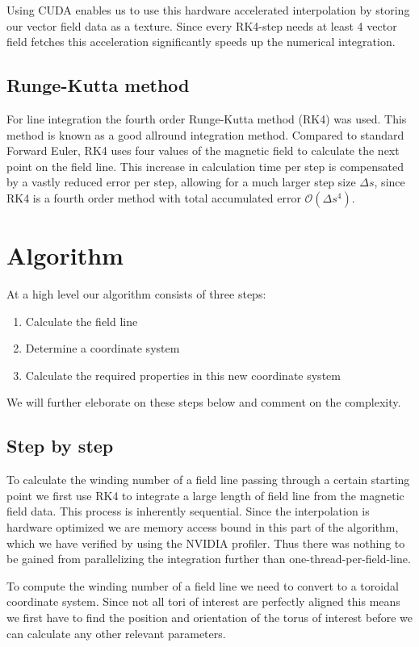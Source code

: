 \documentclass{article}
\renewcommand{\O}[1]{\ensuremath{\mathcal{O}\left(#1\right)}}
\begin{document}
Using CUDA enables us to use this hardware accelerated interpolation by storing our vector field data as a texture. 
Since every RK4-step needs at least 4 vector field fetches this acceleration significantly speeds up the numerical integration. %

\subsection{Runge-Kutta method}
For line integration the fourth order Runge-Kutta method (RK4) was used.  This method is known as a good allround integration method.
Compared to standard Forward Euler, RK4 uses four values of the magnetic field to calculate the next point on the field line. 
This increase in calculation time per step is compensated by a vastly reduced error per step, allowing for a much larger step size $\Delta s$, since RK4 is a fourth order method with total accumulated error $\O{\Delta s^4}$.

\section{Algorithm}
At a high level our algorithm consists of three steps: 
\begin{enumerate}
	\item Calculate the field line
	\item Determine a coordinate system
	\item Calculate the required properties in this new coordinate system
\end{enumerate}
We will further eleborate on these steps below and comment on the complexity.\\

\subsection{Step by step}

To calculate the winding number of a field line passing through a certain starting point we first use RK4 to integrate a large length of field line from the magnetic field data. 
This process is inherently sequential.
Since the interpolation is hardware optimized we are memory access bound in this part of the algorithm, which we have verified by using the NVIDIA profiler. 
Thus there was nothing to be gained from parallelizing the integration further than one-thread-per-field-line.

To compute the winding number of a field line we need to convert to a toroidal coordinate system. Since not all tori of interest are perfectly aligned this means we first have to find the position and orientation of the torus of interest before we can calculate any other relevant parameters.
\end{document}
